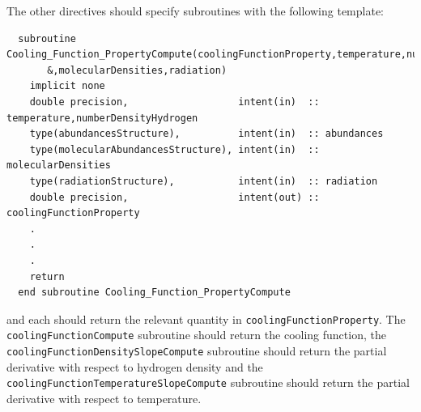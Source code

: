 The other directives should specify subroutines with the following template:
\begin{verbatim}
  subroutine Cooling_Function_PropertyCompute(coolingFunctionProperty,temperature,numberDensityHydrogen,abundances&
       &,molecularDensities,radiation)
    implicit none
    double precision,                   intent(in)  :: temperature,numberDensityHydrogen
    type(abundancesStructure),          intent(in)  :: abundances
    type(molecularAbundancesStructure), intent(in)  :: molecularDensities
    type(radiationStructure),           intent(in)  :: radiation
    double precision,                   intent(out) :: coolingFunctionProperty
    .
    .
    .
    return
  end subroutine Cooling_Function_PropertyCompute
\end{verbatim}
and each should return the relevant quantity in {\tt coolingFunctionProperty}. The {\tt coolingFunctionCompute} subroutine should return the cooling function, the {\tt coolingFunctionDensitySlopeCompute} subroutine should return the partial derivative with respect to hydrogen density and the {\tt coolingFunctionTemperatureSlopeCompute} subroutine should return the partial derivative with respect to temperature.

